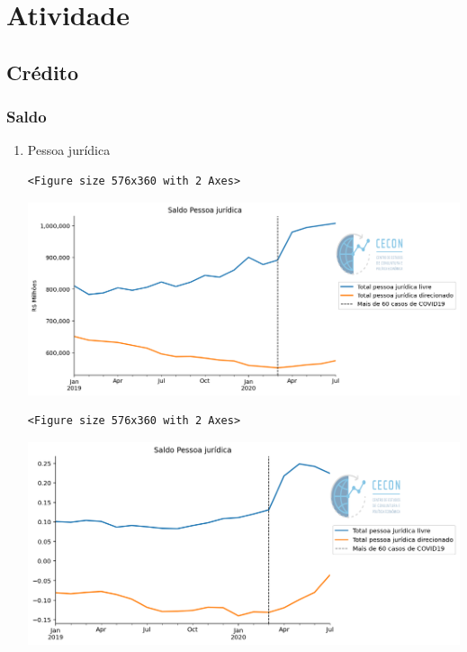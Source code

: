 \documentclass[11pt]{article}
\begin{document}
\section{Atividade}
\label{sec:orgf04114a}

\subsection{Crédito}
\label{sec:orgf7c3d51}


\subsubsection{Saldo}
\label{sec:org495ee79}

\begin{enumerate}
\item Pessoa jurídica
\label{sec:orgd30092b}

\begin{verbatim}
<Figure size 576x360 with 2 Axes>
\end{verbatim}


\begin{center}
\includegraphics[width=.9\linewidth]{obipy-resources/62e383af79e91b63c7fc98dd7fb55b3c3ececcb9/402de444762880e51b3a602c504b7e8d63732349.png}
\end{center}


\begin{verbatim}
<Figure size 576x360 with 2 Axes>
\end{verbatim}


\begin{center}
\includegraphics[width=.9\linewidth]{obipy-resources/62e383af79e91b63c7fc98dd7fb55b3c3ececcb9/8ade2681015bf89863078900a6d91c53bd592f3b.png}
\end{center}


\end{enumerate}
\end{document}
